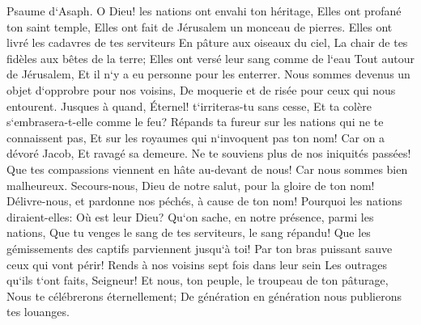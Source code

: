 \verse Psaume d`Asaph. O Dieu! les nations ont envahi ton héritage, Elles ont profané ton saint temple, Elles ont fait de Jérusalem un monceau de pierres. 
\verse Elles ont livré les cadavres de tes serviteurs En pâture aux oiseaux du ciel, La chair de tes fidèles aux bêtes de la terre; 
\verse Elles ont versé leur sang comme de l`eau Tout autour de Jérusalem, Et il n`y a eu personne pour les enterrer. 
\verse Nous sommes devenus un objet d`opprobre pour nos voisins, De moquerie et de risée pour ceux qui nous entourent. 
\verse Jusques à quand, Éternel! t`irriteras-tu sans cesse, Et ta colère s`embrasera-t-elle comme le feu? 
\verse Répands ta fureur sur les nations qui ne te connaissent pas, Et sur les royaumes qui n`invoquent pas ton nom! 
\verse Car on a dévoré Jacob, Et ravagé sa demeure. 
\verse Ne te souviens plus de nos iniquités passées! Que tes compassions viennent en hâte au-devant de nous! Car nous sommes bien malheureux. 
\verse Secours-nous, Dieu de notre salut, pour la gloire de ton nom! Délivre-nous, et pardonne nos péchés, à cause de ton nom! 
\verse Pourquoi les nations diraient-elles: Où est leur Dieu? Qu`on sache, en notre présence, parmi les nations, Que tu venges le sang de tes serviteurs, le sang répandu! 
\verse Que les gémissements des captifs parviennent jusqu`à toi! Par ton bras puissant sauve ceux qui vont périr! 
\verse Rends à nos voisins sept fois dans leur sein Les outrages qu`ils t`ont faits, Seigneur! 
\verse Et nous, ton peuple, le troupeau de ton pâturage, Nous te célébrerons éternellement; De génération en génération nous publierons tes louanges. 

\chapter{}

